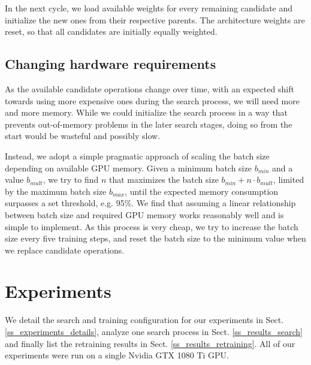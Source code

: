 \documentclass[conference]{IEEEtran}
\begin{document}
In the next cycle, we load available weights for every remaining candidate and initialize the new ones from their respective parents. The architecture weights are reset, so that all candidates are initially equally weighted.



\subsection{Changing hardware requirements}
\label{ss_methods_hardware}

As the available candidate operations change over time, with an expected shift towards using more expensive ones during the search process, we will need more and more memory. 
While we could initialize the search process in a way that prevents out-of-memory problems in the later search stages, doing so from the start would be wasteful and possibly slow.

Instead, we adopt a simple pragmatic approach of scaling the batch size depending on available GPU memory. Given a minimum batch size $b_{min}$ and a value $b_{mult}$, we try to find $n$ that maximizes the batch size $b_{min} + n \cdot b_{mult}$, limited by the maximum batch size $b_{max}$, until the expected memory consumption surpasses a set threshold, e.g. 95\%.
We find that assuming a linear relationship between batch size and required GPU memory works reasonably well and is simple to implement. As this process is very cheap, we try to increase the batch size every five training steps, and reset the batch size to the minimum value when we replace candidate operations.












\section{Experiments}
\label{s_experiments}

We detail the search and training configuration for our experiments in Sect. \ref{ss_experiments_details}, analyze one search process in Sect. \ref{ss_results_search} and finally list the retraining results in Sect. \ref{ss_results_retraining}.
All of our experiments were run on a single Nvidia GTX 1080 Ti GPU.
\end{document}
